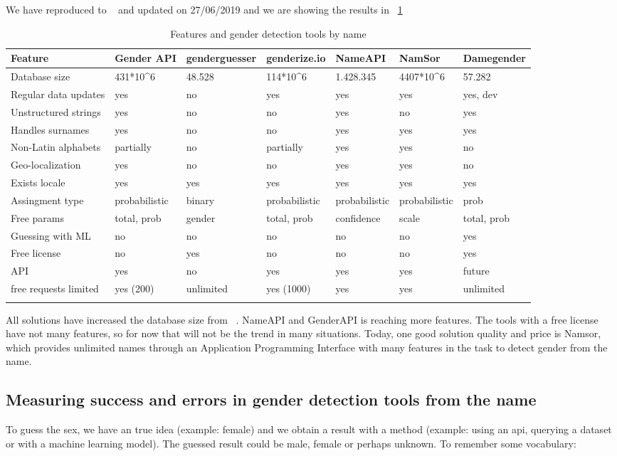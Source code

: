 \documentclass[fleqn,10pt,lineno]{wlpeerj} %
\begin{document}
We have reproduced to ~\cite{10.7717/peerj-cs.156} and updated on
27/06/2019 and we are showing the results in
~\ref{table:featuresAndGenderDetectionToolsByName}

\begin{longtable}[]{@{}lllllll@{}}
\toprule
Feature & Gender API & genderguesser & genderize.io & NameAPI & NamSor & Damegender\tabularnewline
\midrule
\endhead
Database size & 431*10^6 & 48.528 & 114*10^6 & 1.428.345 & 4407*10^6  & 57.282\tabularnewline
Regular data updates & yes & no & yes & yes & yes & yes, dev\tabularnewline
Unstructured strings & yes & no & no & yes & no & yes\tabularnewline
Handles surnames & yes & no & no & yes & yes & yes\tabularnewline
Non-Latin alphabets & partially & no & partially & yes & yes & no\tabularnewline
Geo-localization & yes & no & no & yes & yes & no\tabularnewline
Exists locale & yes & yes & yes & yes & yes & yes\tabularnewline
Assingment type & probabilistic & binary & probabilistic & probabilistic & probabilistic & prob\tabularnewline
Free params & total, prob & gender & total, prob & confidence & scale & total, prob\tabularnewline
Guessing with ML & no & no & no & no & no & yes\tabularnewline
Free license & no & yes & no & no & no & yes\tabularnewline
API & yes & no & yes & yes & yes & future\tabularnewline
free requests limited & yes (200) & unlimited & yes (1000) & yes & yes & unlimited\tabularnewline
\bottomrule
\caption{Features and gender detection tools by name}
\label{table:featuresAndGenderDetectionToolsByName}
\end{longtable}

All solutions have increased the database size from
~\cite{10.7717/peerj-cs.156}. NameAPI and GenderAPI is reaching more
features. The tools with a free license have not many features, so for
now that will not be the trend in many situations. Today, one good
solution quality and price is Namsor, which provides unlimited names
through an Application Programming Interface with many features in the
task to detect gender from the name.

\subsection*{Measuring success and errors in gender detection tools from the name}

To guess the sex, we have an true idea (example: female) and we obtain
a result with a method (example: using an api, querying a dataset or
with a machine learning model). The guessed result could be male,
female or perhaps unknown. To remember some vocabulary:
\end{document}
